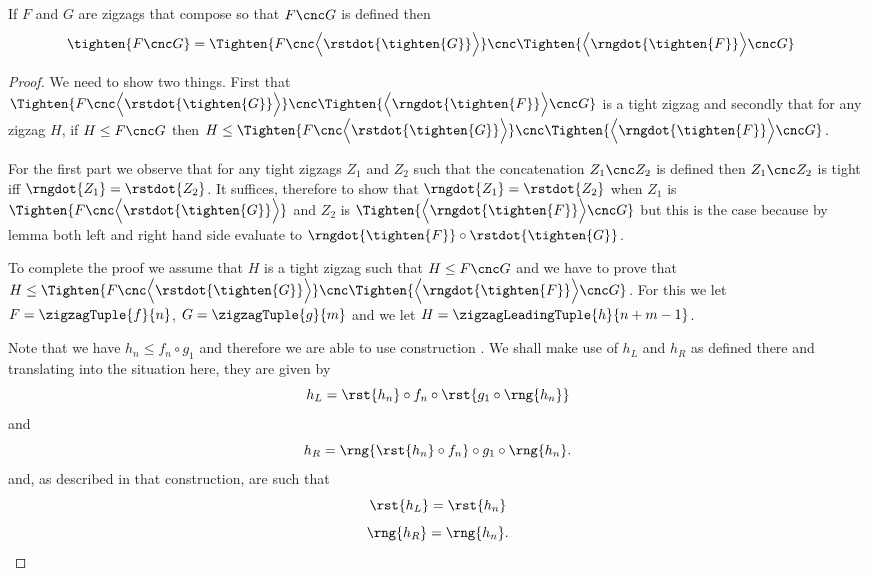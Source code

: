 {%
\newcommand{\tighteningLeft}{\Tighten{ F \cnc 
                               \Bigl\langle
                                  \rstdot{\tighten{G}}
                               \Bigr\rangle
                                      }
                            }


\newcommand {\tighteningRight}{\Tighten{ 
                                    \Bigl\langle
                                      \rngdot{\tighten{F}} 
                                    \Bigr\rangle
                                  \cnc G
                                        }
                              }
\newcommand {\theTightening}{\tighteningLeft \cnc \tighteningRight}
\begin{lemma}
If $F$ and $G$ are zigzags that compose so that
$F \cnc G$ is defined then
\begin{align*}
\tighten{F \cnc G} 
    &= \theTightening
\end{align*}
\end{lemma}
\begin{proof}
We need to show two things. First that  $\theTightening$
is a tight zigzag and secondly that for any 
zigzag $H$, if $H \leq F \cnc G$ then $H \leq \theTightening$.

For the first part we  observe that for any tight zigzags
$Z_1$ and $Z_2$ such that the concatenation $Z_1 \cnc Z_2$ is defined then $Z_1 \cnc Z_2$ is tight iff $\rngdot{Z_1} = \rstdot{Z_2}$. It suffices, therefore to show that $\rngdot{Z_1} = \rstdot{Z_2}$
when $Z_1$ is $\tighteningLeft$ and
$Z_2$ is $\tighteningRight$
but this is the case because by lemma  both left and right hand side evaluate  to 
$\rngdot{\tighten{F}} \circ \rstdot{\tighten{G}}$.

To complete the proof we assume that $H$ is a tight zigzag such that $H \leq F \cnc G$ and we have to prove that 
$H \leq \theTightening$. For this we let
$F=\zigzagTuple{f}{n}$, $G=\zigzagTuple{g}{m}$
and we let $H=\zigzagLeadingTuple{h}{n+m-1}$.

Note that we have $h_n \leq f_n \circ g_1$ and therefore
we are able to
use construction . 
We shall make use of $h_L$ and $h_R$ as defined there and translating into the situation here, they are given by
\[
h_L = \rst{h_n} \circ f_n \circ \rst{g_1 \circ \rng{h_n}}
\]
and  
\newcommand{\hR}{\rng{\rst{h_n} \circ f_n} \circ g_1 \circ \rng{h_n}}
\[
h_R = \hR.
\]
and, as described in that construction, are such that
\begin{equation}
\label{rstOfhL}
\rst{h_L}=\rst{h_n}
\end{equation}
\begin{equation}
\label{rngOfhR}
\rng{h_R}=\rng{h_n}.
\end{equation}


\end{proof}}
